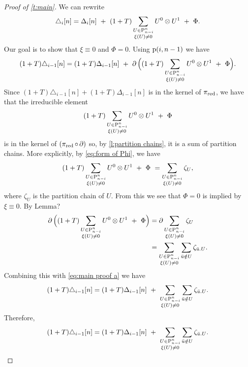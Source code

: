 \begin{proof}[Proof of \cref{t:main}]
	We can rewrite
	\[
	\triangle_i[n] = \Delta_i[n] \ +\
	(1+T) \sum_{\substack{U \in \P_{n-i}^n \\ \xi(U) \neq 0}} U^0 \ot U^1 \ +\
	\Phi.
	\]
	Our goal is to show that $\xi \equiv 0$ and $\Phi = 0$.
	Using $\p(i,n-1)$ we have
	\begin{equation}\label{eq:main proof a}
		(1+T)\triangle_{i-1}[n] = (1+T)\Delta_{i-1}[n] \ +\
		\bd\Big((1+T)\sum_{\substack{U \in \P_{n-i}^n \\ \xi(U) \neq 0}} U^0 \ot U^1 \ + \ \Phi \Big).
	\end{equation}
	Since $(1+T)\triangle_{i-1}[n] + (1+T)\Delta_{i-1}[n]$ is in the kernel of $\pired$, we have that the irreducible element
	\[
	(1+T)\sum_{\substack{U \in \P_{n-i}^n \\ \xi(U) \neq 0}} U^0 \ot U^1 \ + \ \Phi
	\]
	is in the kernel of $(\pired \circ \bd)$ so, by \cref{l:partition chains}, it is a sum of partition chains.
	More explicitly, by \eqref{eq:form of Phi}, we have
	\[
	(1+T)\sum_{\substack{U \in \P_{n-i}^n \\ \xi(U) \neq 0}} U^0 \ot U^1 \ + \ \Phi \
	= \sum_{\substack{U \in \P_{n-i}^n \\ \xi(U) \neq 0}} \zeta_U,
	\]
	where $\zeta_U$ is the partition chain of $U$.
	From this we see that $\Phi = 0$ is implied by $\xi \equiv 0$.
	By Lemma?
	\begin{align*}
		\bd\Big((1+T)\sum_{\substack{U \in \P_{n-i}^n \\ \xi(U) \neq 0}} U^0 \ot U^1 \ + \ \Phi \Big)
		&= \bd \sum_{\substack{U \in \P_{n-i}^n \\ \xi(U) \neq 0}} \zeta_U \\
		&= \sum_{\substack{U \in \P_{n-i}^n \\ \xi(U) \neq 0}} \sum_{\bar{u} \notin U} \zeta_{\bar{u}.U}.
	\end{align*}
	Combining this with \eqref{eq:main proof a} we have
	\[
	(1+T)\triangle_{i-1}[n] = (1+T)\Delta_{i-1}[n] \ +\
	\sum_{\substack{U \in \P_{n-i}^n \\ \xi(U) \neq 0}} \sum_{\bar{u} \notin U} \zeta_{\bar{u}.U}.
	\]
	Therefore,
	\[
	(1+T)\triangle_{i-1}[n] = (1+T)\Delta_{i-1}[n] \ +\
	\sum_{\substack{U \in \P_{n-i}^n \\ \xi(U) \neq 0}} \sum_{\bar{u} \notin U} \zeta_{\bar{u}.U}.
	\]


\end{proof}